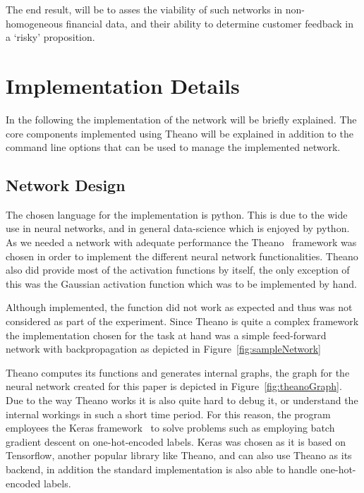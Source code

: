 \documentclass[12pt]{article}
\begin{document}
The end result, will be to asses the viability of such networks in non-homogeneous financial data, and their ability to determine customer feedback in a `risky' proposition.

\section{Implementation Details}
\label{sec:implementation_details}

In the following the implementation of the network will be briefly explained. The core components implemented using Theano will be explained in addition to the command line options that can be used to manage the implemented network.

\subsection{Network Design}
\label{sub:network_design}

The chosen language for the implementation is python. This is due to the wide use in neural networks, and in general data-science which is enjoyed by python. As we needed a network with adequate performance the Theano~\cite{theanoTutorial} framework was chosen in order to implement the different neural network functionalities. Theano also did provide most of the activation functions by itself, the only exception of this was the Gaussian activation function which was to be implemented by hand. 

Although implemented, the function did not work as expected and thus was not considered as part of the experiment. Since Theano is quite a complex framework the implementation chosen for the task at hand was a simple feed-forward network with backpropagation as depicted in Figure~\ref{fig:sampleNetwork}

Theano computes its functions and generates internal graphs, the graph for the neural network created for this paper is depicted in Figure~\ref{fig:theanoGraph}. Due to the way Theano works it is also quite hard to debug it, or understand the internal workings in such a short time period. For this reason, the program employees the Keras framework~\cite{keras} to solve problems such as employing batch gradient descent on one-hot-encoded labels. Keras was chosen as it is based on Tensorflow, another popular library like Theano, and can also use Theano as its backend, in addition the standard implementation is also able to handle one-hot-encoded labels.
\end{document}
